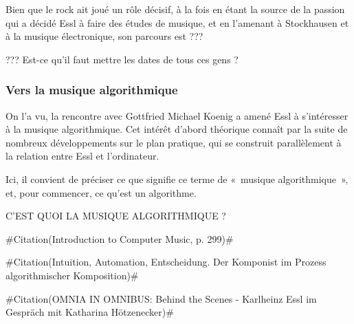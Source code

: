 \documentclass[a4paper,12pt]{article}
\newcommand{\guill}[1]{«~#1~»}
\newcommand{\zitat}[2]{\#Citation(#2)\#}
\begin{document}
Bien que le rock ait joué un rôle décisif, à la fois en étant la source de la passion qui a décidé Essl à faire des études de musique, et en l'amenant à Stockhausen et à la musique électronique, son parcours est ???

??? Est-ce qu'il faut mettre les dates de tous ces gens ?

\subsubsection{Vers la musique algorithmique}

On l'a vu, la rencontre avec Gottfried Michael Koenig a amené Essl à s'intéresser à la musique algorithmique. Cet intérêt d'abord théorique connaît par la suite de nombreux développements sur le plan pratique, qui se construit parallèlement à la relation entre Essl et l'ordinateur.

Ici, il convient de préciser ce que signifie ce terme de \guill{musique algorithmique}, et, pour commencer, ce qu'est un algorithme. 

C'EST QUOI LA MUSIQUE ALGORITHMIQUE ?

\zitat{Formally speaking, algorithmic composition is the creation of algorithms whose output has clear musical consequences of use to the composer, from the production and exploration of musical materials to the generation of complete works.}
{Introduction to Computer Music, p. 299}

\zitat{Man sollte sich zunächst die Frage stellen, was denn ein Algorithmus ist. Da gibt es klassische Definitionen, die eher aus den Ingenieurswissenschaften kommen, die beschreiben den Algorithmus als eine Art Kochrezept um schnell zu einer Lösung zu kommen. Dies ist ein möglicher Ansatz, aber es gibt noch einen weiteren, den ich interessanter finde. Dort begreift man einen Algorithmus mehr als Definition eines Metamodells, aus dem heraus durch Veränderung der Systemparameter verschiedenste Resultate entstehen. Diesen Algorithmusbegriff verwende ich selber und finde ihn auch in Werken und Arbeiten von Gottfried Michael Koenig und Karlheinz Stockhausen.}
{Intuition, Automation, Entscheidung. Der Komponist im Prozess algorithmischer Komposition}

\zitat{weil wir ja immer noch über Algorithmen sprechen. Dieser Begriff hat nichts mit Rhythmen zu tun, sondern ist nach diesem Mathematiker al-Chwarizmi benannt, der verschiedene mathematische Konzepte eingeführt hat. Diese sind auch die Grundlage meines Musikdenkens, Musik nicht nur als ein sinnliches Erlebnis zu sehen, sondern als etwas, das viele Tiefendimensionen hat, die sich in Form von Modellen ausdrücken lassen.}
{OMNIA IN OMNIBUS: Behind the Scenes - Karlheinz Essl im Gespräch mit Katharina Hötzenecker}
\end{document}
